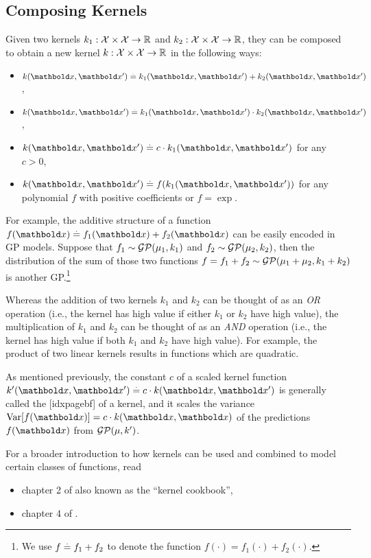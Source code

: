 \subsection{Composing Kernels}

Given two kernels $k_1 : \mathcal{X} \times \mathcal{X} \to \mathbb{R}$ and $k_2 : \mathcal{X} \times \mathcal{X} \to \mathbb{R}$, they can be composed to obtain a new kernel $k : \mathcal{X} \times \mathcal{X} \to \mathbb{R}$ in the following ways: \begin{itemize}
  \item $k(\vx, \vxp) \defeq k_1(\vx, \vxp) + k_2(\vx, \vxp)$,
  \item $k(\vx, \vxp) \defeq k_1(\vx, \vxp) \cdot k_2(\vx, \vxp)$,
  \item $k(\vx, \vxp) \defeq c \cdot k_1(\vx, \vxp)$ for any $c > 0$,
  \item $k(\vx, \vxp) \defeq f(k_1(\vx, \vxp))$ for any polynomial $f$ with positive coefficients or $f = \exp$.
\end{itemize}

For example, the additive structure of a function $f(\vx) \defeq f_1(\vx) + f_2(\vx)$ can be easily encoded in GP models. Suppose that $f_1 \sim \GP{\mu_1}{k_1}$ and $f_2 \sim \GP{\mu_2}{k_2}$, then the distribution of the sum of those two functions $f = f_1 + f_2 \sim \GP{\mu_1 + \mu_2}{k_1 + k_2}$ is another GP.\footnote{We use $f \overset{.}{=} f_1 + f_2$ to denote the function $f(\cdot) = f_1(\cdot) + f_2(\cdot)$.}

Whereas the addition of two kernels $k_1$ and $k_2$ can be thought of as an \emph{OR} operation (i.e., the kernel has high value if either $k_1$ or $k_2$ have high value), the multiplication of $k_1$ and $k_2$ can be thought of as an \emph{AND} operation (i.e., the kernel has high value if both $k_1$ and $k_2$ have high value). For example, the product of two linear kernels results in functions which are quadratic.

As mentioned previously, the constant $c$ of a scaled kernel function $k'(\vx, \vxp) \defeq c \cdot k(\vx, \vxp)$ is generally called the [idxpagebf] of a kernel, and it scales the variance $\Var{f(\vx)} = c \cdot k(\vx, \vx)$ of the predictions $f(\vx)$ from $\GP{\mu}{k'}$.

\begin{oreadings}
  For a broader introduction to how kernels can be used and combined to model certain classes of functions, read \begin{itemize}
    \item chapter 2 of  also known as the ``kernel cookbook'',
    \item chapter 4 of .
  \end{itemize}
\end{oreadings}

